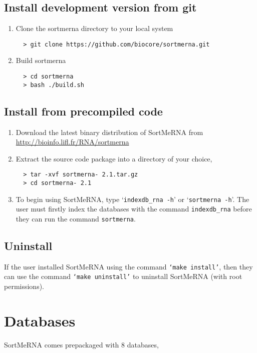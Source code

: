 \documentclass[10pt,a4paper]{article}
\begin{document}
\subsection{Install development version from git}
\label{sec:install}

\begin{enumerate}
 \item Clone the sortmerna directory to your local system
 \begin{verbatim}
  > git clone https://github.com/biocore/sortmerna.git
 \end{verbatim}
 \item Build sortmerna
  \begin{verbatim}
  > cd sortmerna
  > bash ./build.sh
 \end{verbatim}



\end{enumerate}

\subsection{Install from precompiled code}

\begin{enumerate}
 \item Download the latest binary distribution of SortMeRNA from \url{http://bioinfo.lifl.fr/RNA/sortmerna}
 \item Extract the source code package into a directory of your choice,
 \begin{verbatim}
  > tar -xvf sortmerna- 2.1.tar.gz 
  > cd sortmerna- 2.1
 \end{verbatim}
 \item To begin using SortMeRNA, type `\texttt{indexdb\_rna -h}' or `\texttt{sortmerna -h}'. The user must firstly index 
 the databases with the command \texttt{indexdb\_rna} before they can run the command \texttt{sortmerna}.
 
\end{enumerate}

\subsection{Uninstall}

\noindent If the user installed SortMeRNA using the command \texttt{`make install'}, then they can use the command \texttt{`make uninstall'} to
uninstall SortMeRNA (with root permissions).

\section{Databases}
\noindent SortMeRNA comes prepackaged with 8 databases,\\
\end{document}
